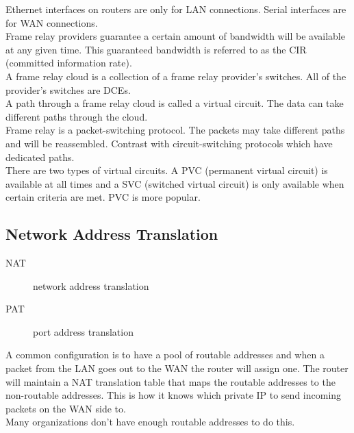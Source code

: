 Ethernet interfaces on routers are only for LAN connections. Serial interfaces
are for WAN connections.\\

Frame relay providers guarantee a certain amount of bandwidth will be
available at any given time. This guaranteed bandwidth is referred to as
the CIR (committed information rate).\\

A frame relay cloud is a collection of a frame relay provider's switches.
All of the provider's switches are DCEs.\\

A path through a frame relay cloud is called a virtual circuit. The data
can take different paths through the cloud.\\

Frame relay is a packet-switching protocol. The packets may take different
paths and will be reassembled. Contrast with circuit-switching protocols
which have dedicated paths.\\

There are two types of virtual circuits. A PVC (permanent virtual circuit)
is available at all times and a SVC (switched virtual circuit) is only
available when certain criteria are met. PVC is more popular.

\subsection{Network Address Translation}

\begin{description}

\item[NAT]
network address translation  

\item[PAT]
port address translation

\end{description}

A common configuration is to have a pool of routable addresses and when a
packet from the LAN goes out to the WAN the router will assign one. The
router will maintain a NAT translation table that maps the routable addresses
to the non-routable addresses. This is how it knows which private IP to
send incoming packets on the WAN side to.\\

Many organizations don't have enough routable addresses to do this.\\


